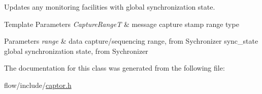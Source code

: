 Updates any monitoring facilities with global synchronization state. 


\begin{DoxyTemplParams}{Template Parameters}
{\em Capture\+RangeT} & message capture stamp range type\\
\hline
\end{DoxyTemplParams}

\begin{DoxyParams}{Parameters}
{\em range} & data capture/sequencing range, from Sychronizer sync\+\_\+state global synchronization state, from Sychronizer \\
\hline
\end{DoxyParams}


The documentation for this class was generated from the following file\+:\begin{DoxyCompactItemize}
\item 
flow/include/\hyperlink{captor_8h}{captor.\+h}\end{DoxyCompactItemize}
